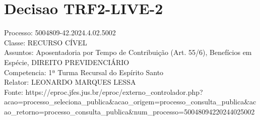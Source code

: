\documentclass[12pt]{article}
\begin{document}
\section*{Decisao TRF2-LIVE-2}
Processo: 5004809-42.2024.4.02.5002\\
Classe: RECURSO CÍVEL\\
Assuntos: Aposentadoria por Tempo de Contribuição (Art. 55/6), Benefícios em Espécie, DIREITO PREVIDENCIÁRIO\\
Competencia: 1ª Turma Recursal do Espírito Santo\\
Relator: LEONARDO MARQUES LESSA\\
Fonte: https://eproc.jfes.jus.br/eproc/externo\_controlador.php?acao=processo\_seleciona\_publica\&acao\_origem=processo\_consulta\_publica\&acao\_retorno=processo\_consulta\_publica\&num\_processo=50048094220244025002
\end{document}
